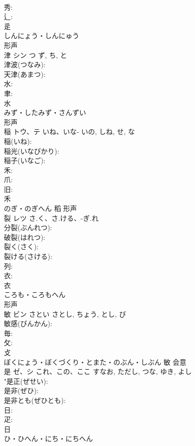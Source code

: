 \documentclass[8pt]{extreport}
\begin{document}
\begin{CJK}{UTF8}{min}
\\	秀: 
\\	辶: 
\\	辵	
\\	しんにょう・しんにゅう	
\\	形声 
\\	津	シン	つ	ず, ち, と	
\\	津波(つなみ): 
\\	天津(あまつ): 
\\	水: 
\\	聿: 
\\	水	
\\	みず・したみず・さんずい	
\\	形声 
\\	稲	トウ、テ	いね、いな-	いの, しね, せ, な	
\\	稲(いね): 
\\	稲光(いなびかり): 
\\	稲子(いなご): 
\\	禾: 
\\	爪: 
\\	旧: 
\\	禾	
\\	のぎ・のぎへん	稻	形声 
\\	裂	レツ	さ.く、さ.ける、-ぎ.れ		
\\	分裂(ぶんれつ): 
\\	破裂(はれつ): 
\\	裂く(さく): 
\\	裂ける(さける): 
\\	列: 
\\	衣: 
\\	衣	
\\	ころも・ころもへん	
\\	形声 
\\	敏	ビン	さとい	さとし, ちょう, とし, び	
\\	敏感(びんかん): 
\\	毎: 
\\	攵: 
\\	攴	
\\	ぼくにょう・ぼくづくり・とまた・のぶん・しぶん	敏	会意 
\\	是	ゼ、シ	これ、この、ここ	すなお, ただし, つな, ゆき, よし	
\\	"是正(ぜせい): 
\\	是非(ぜひ): 
\\	是非とも(ぜひとも): 
\\	日: 
\\	疋: 
\\	日	
\\	ひ・ひへん・にち・にちへん	

\end{CJK}
\end{document}

